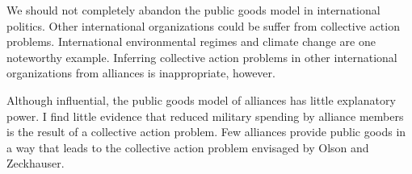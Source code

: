\documentclass[12pt]{article}
\begin{document}
We should not completely abandon the public goods model in international politics. 
Other international organizations could be suffer from collective action problems.
International environmental regimes and climate change are one noteworthy example.  
Inferring collective action problems in other international organizations from alliances is inappropriate, however. 


Although influential, the public goods model of alliances has little explanatory power. 
I find little evidence that reduced military spending by alliance members is the result of a collective action problem. 
Few alliances provide public goods in a way that leads to the collective action problem envisaged by Olson and Zeckhauser. 



\singlespace


 
\end{document}
